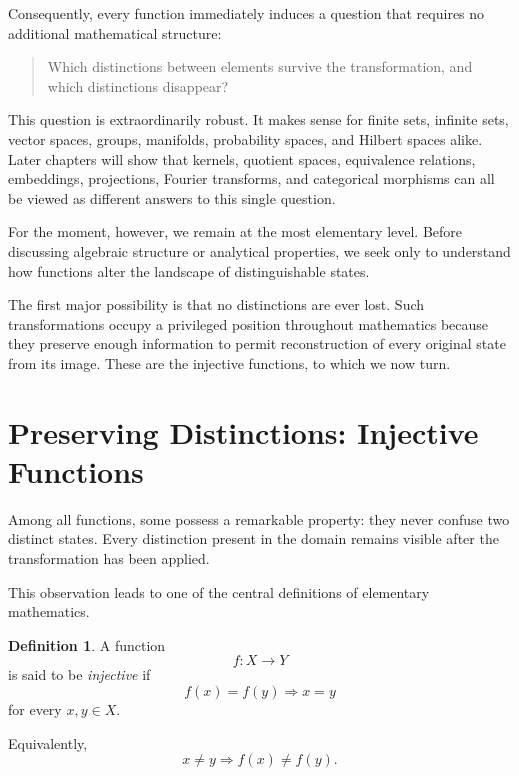 \documentclass[11pt]{book}
\numberwithin{equation}{chapter}
\theoremstyle{definition}
\newtheorem{definition}{Definition}[chapter]
\theoremstyle{plain}
\theoremstyle{remark}
\begin{document}
Consequently, every function immediately induces a question that requires no additional mathematical structure:

\begin{quote}
Which distinctions between elements survive the transformation, and which distinctions disappear?
\end{quote}

This question is extraordinarily robust. It makes sense for finite sets, infinite sets, vector spaces, groups, manifolds, probability spaces, and Hilbert spaces alike. Later chapters will show that kernels, quotient spaces, equivalence relations, embeddings, projections, Fourier transforms, and categorical morphisms can all be viewed as different answers to this single question.

For the moment, however, we remain at the most elementary level. Before discussing algebraic structure or analytical properties, we seek only to understand how functions alter the landscape of distinguishable states.

The first major possibility is that no distinctions are ever lost. Such transformations occupy a privileged position throughout mathematics because they preserve enough information to permit reconstruction of every original state from its image. These are the injective functions, to which we now turn.


\section{Preserving Distinctions: Injective Functions}

Among all functions, some possess a remarkable property: they never confuse two distinct states. Every distinction present in the domain remains visible after the transformation has been applied.

This observation leads to one of the central definitions of elementary mathematics.

\begin{definition}
A function
\[
f:X\rightarrow Y
\]
is said to be \emph{injective} if
\[
f(x)=f(y)
\Longrightarrow
x=y
\]
for every \(x,y\in X\).

Equivalently,
\[
x\neq y
\Longrightarrow
f(x)\neq f(y).
\]
\end{definition}
\end{document}
